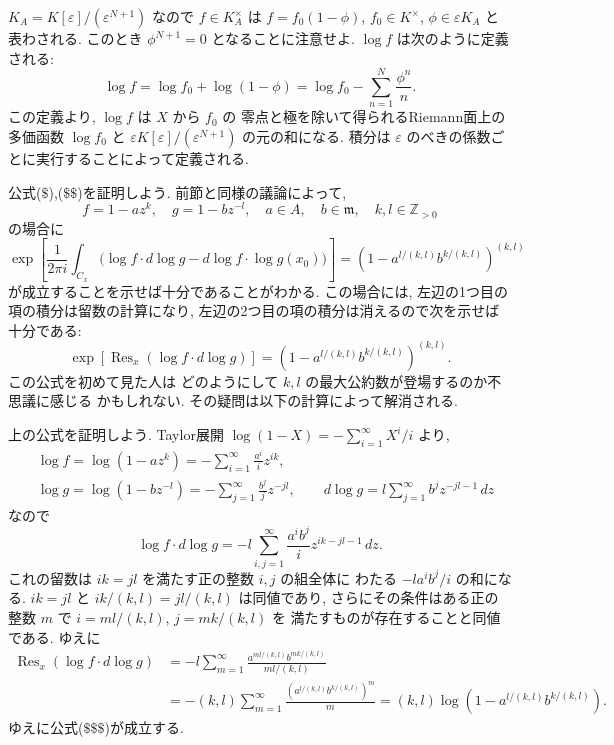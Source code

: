 \documentclass[12pt,twoside]{jarticle}
\newcommand\Z{{\mathbb Z}} %
\theoremstyle{definition} %
\theoremstyle{definition} %
\theoremstyle{definition} %
\numberwithin{theorem}{section}
\numberwithin{equation}{section}
\numberwithin{figure}{section}
\numberwithin{table}{section}
\newcommand\Res{\mathop{\mathrm{Res}}\nolimits}
\newcommand\eps{\varepsilon}
\newcommand\m{{\mathfrak m}}
\begin{document}
$K_A=K[\eps]/(\eps^{N+1})$ なので $f\in K_A^\times$ は
$f=f_0(1-\phi)$, 
$f_0\in K^\times$, $\phi\in\eps K_A$ と表わされる.
このとき $\phi^{N+1}=0$ となることに注意せよ.
$\log f$ は次のように定義される:
\[
\log f
= \log f_0 + \log(1-\phi)
= \log f_0 - \sum_{n=1}^N \frac{\phi^n}{n}.
\]
この定義より, $\log f$ は $X$ から $f_0$ の
零点と極を除いて得られるRiemann面上の多価函数 $\log f_0$ 
と $\eps K[\eps]/(\eps^{N+1})$ の元の和になる.
積分は $\eps$ のべきの係数ごとに実行することによって定義される.

公式($\$$),($\$\$$)を証明しよう.
前節と同様の議論によって,
\[
f=1-az^k, \quad g=1-bz^{-l}, \quad a\in A,\quad b\in\m, \quad k,l\in\Z_{>0}
\]
の場合に
\[
\exp\left[
\frac{1}{2\pi i}\int_{C_x} \bigl(
  \log f\cdot d\log g - d\log f\cdot\log g(x_0)
\bigr)
\right]
=
\left( 1 - a^{l/(k,l)}b^{k/(k,l)} \right)^{(k,l)}
\]
が成立することを示せば十分であることがわかる.
この場合には, 
左辺の1つ目の項の積分は留数の計算になり, 
左辺の2つ目の項の積分は消えるので次を示せば十分である:
\[
\exp\left[
\Res_x(\log f\cdot d\log g)
\right]
=
\left( 1 - a^{l/(k,l)}b^{k/(k,l)} \right)^{(k,l)}.
\tag{$\$\$\$$}
\]
この公式を初めて見た人は
どのようにして $k,l$ の最大公約数が登場するのか不思議に感じる
かもしれない. その疑問は以下の計算によって解消される.

上の公式を証明しよう. Taylor展開 $\log(1-X)=-\sum_{i=1}^\infty X^i/i$ より, 
\begin{align*}
&
\log f = \log(1-az^k) = - \sum_{i=1}^\infty \frac{a^i}{i} z^{ik}, 
\\ &
\log g = \log(1-bz^{-l}) = - \sum_{j=1}^\infty \frac{b^j}{j} z^{-jl},
\qquad
d\log g = l \sum_{j=1}^\infty b^j z^{-jl-1}\,dz
\end{align*}
なので
\[
\log f\cdot d\log g
= -l \sum_{i,j=1}^\infty \frac{a^i b^j}{i} z^{ik-jl-1}\,dz.
\]
これの留数は $ik=jl$ を満たす正の整数 $i,j$ の組全体に
わたる $-la^ib^j/i$ の和になる. 
$ik=jl$ と $ik/(k,l)=jl/(k,l)$ は同値であり, 
さらにその条件はある正の整数 $m$ で $i=ml/(k,l)$, $j=mk/(k,l)$ を
満たすものが存在することと同値である. ゆえに
\begin{align*}
\Res_x(\log f\cdot d\log g)
&
= -l \sum_{m=1}^\infty \frac{a^{ml/(k,l)}b^{mk/(k,l)}}{ml/(k,l)}
\\ &
= -(k,l)\sum_{m=1}^\infty 
  \frac{\left( a^{l/(k,l)}b^{k/(k,l)} \right)^{m}}{m}
= (k,l)\log\left( 1 - a^{l/(k,l)}b^{k/(k,l)} \right).
\end{align*}
ゆえに公式($\$\$\$$)が成立する.

\end{document}
